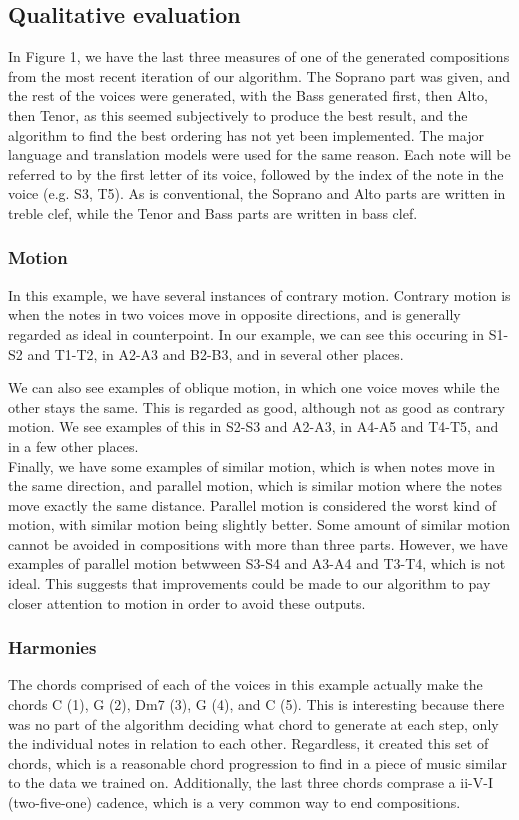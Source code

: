 \documentclass{sig-alternate}
\begin{document}
\subsection{Qualitative evaluation}
In Figure 1, we have the last three measures of one of the generated compositions from the most recent iteration of our algorithm. The Soprano part was given, and the rest of the voices were generated, with the Bass generated first, then Alto, then Tenor, as this seemed subjectively to produce the best result, and the algorithm to find the best ordering has not yet been implemented. The major language and translation models were used for the same reason. Each note will be referred to by the first letter of its voice, followed by the index of the note in the voice (e.g. S3, T5). As is conventional, the Soprano and Alto parts are written in treble clef, while the Tenor and Bass parts are written in bass clef.

\subsubsection{Motion}

In this example, we have several instances of contrary motion. Contrary motion is when the notes in two voices move in opposite directions, and is generally regarded as ideal in counterpoint. In our example, we can see this occuring in S1-S2 and T1-T2, in A2-A3 and B2-B3, and in several other places.

We can also see examples of oblique motion, in which one voice moves while the other stays the same. This is regarded as good, although not as good as contrary motion. We see examples of this in S2-S3 and A2-A3, in A4-A5 and T4-T5, and in a few other places.\\
Finally, we have some examples of similar motion, which is when notes move in the same direction, and parallel motion, which is similar motion where the notes move exactly the same distance. Parallel motion is considered the worst kind of motion, with similar motion being slightly better. Some amount of similar motion cannot be avoided in compositions with more than three parts. However, we have examples of parallel motion betwween S3-S4 and A3-A4 and T3-T4, which is not ideal. This suggests that improvements could be made to our algorithm to pay closer attention to motion in order to avoid these outputs.

\subsubsection{Harmonies}
The chords comprised of each of the voices in this example actually make the chords C (1), G (2), Dm7 (3), G (4), and C (5). This is interesting because there was no part of the algorithm deciding what chord to generate at each step, only the individual notes in relation to each other. Regardless, it created this set of chords, which is a reasonable chord progression to find in a piece of music similar to the data we trained on. Additionally, the last three chords comprase a ii-V-I (two-five-one) cadence, which is a very common way to end compositions.
\end{document}
